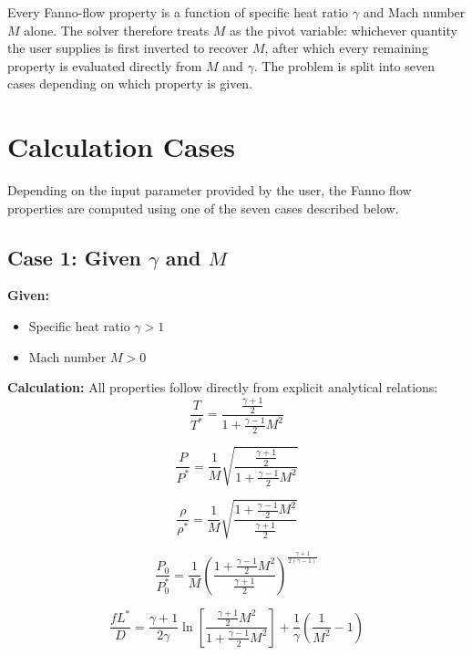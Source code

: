 Every Fanno-flow property is a function of specific heat ratio $\gamma$ and Mach number $M$ alone. The solver therefore treats $M$ as the pivot variable: whichever quantity the user supplies is first inverted to recover $M$, after which every remaining property is evaluated directly from $M$ and $\gamma$. The problem is split into seven cases depending on which property is given.

\section{Calculation Cases}

Depending on the input parameter provided by the user, the Fanno flow properties are computed using one of the seven cases described below.

\subsection*{Case 1: Given $\gamma$ and $M$}

\textbf{Given:}
\begin{itemize}[nosep]
    \item Specific heat ratio $\gamma > 1$
    \item Mach number $M > 0$
\end{itemize}

\textbf{Calculation:} All properties follow directly from explicit analytical relations:
\begin{equation}
\frac{T}{T^*} = \frac{\frac{\gamma+1}{2}}{1+\frac{\gamma-1}{2}M^2}
\end{equation}

\begin{equation}
\frac{P}{P^*} = \frac{1}{M}\sqrt{\frac{\frac{\gamma+1}{2}}{1+\frac{\gamma-1}{2}M^2}}
\end{equation}

\begin{equation}
\frac{\rho}{\rho^*} = \frac{1}{M}\sqrt{\frac{1+\frac{\gamma-1}{2}M^2}{\frac{\gamma+1}{2}}}
\end{equation}

\begin{equation}
\frac{P_0}{P_0^*} = \frac{1}{M}\left(\frac{1+\frac{\gamma-1}{2}M^2}{\frac{\gamma+1}{2}}\right)^{\frac{\gamma+1}{2(\gamma-1)}}
\end{equation}

\begin{equation}
\frac{f L^*}{D} = \frac{\gamma+1}{2\gamma}\ln\left[\frac{\frac{\gamma+1}{2}M^2}{1+\frac{\gamma-1}{2}M^2}\right] + \frac{1}{\gamma}\left(\frac{1}{M^2}-1\right)
\end{equation}

